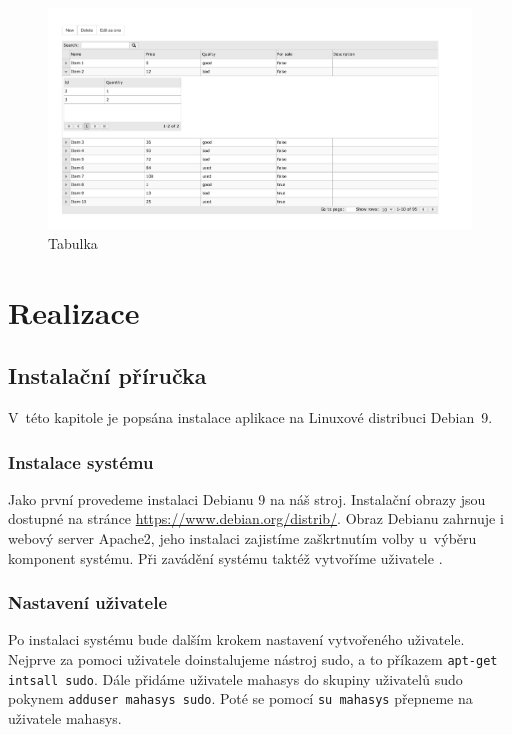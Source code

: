 \documentclass[thesis=B,czech]{FITthesis}[2012/06/26]
\begin{document}
\begin{figure}
	\includegraphics[width=500pt, height=\textwidth, angle=90]{data_table.pdf}
	\caption{Tabulka}\label{tabulka}
\end{figure}
	

\chapter{Realizace}

\section{Instalační příručka}
	V~této kapitole je popsána instalace aplikace na Linuxové distribuci Debian~9.
\subsection{Instalace systému}
	Jako první provedeme instalaci Debianu 9 na náš stroj. Instalační obrazy jsou dostupné na stránce \url{https://www.debian.org/distrib/}. Obraz Debianu zahrnuje i webový server Apache2, jeho instalaci zajistíme zaškrtnutím volby  u~výběru komponent systému. Při zavádění systému taktéž vytvoříme uživatele .
\subsection{Nastavení uživatele}
	Po instalaci systému bude dalším krokem nastavení vytvořeného uživatele. Nejprve za pomoci uživatele  doinstalujeme nástroj sudo, a to příkazem \verb|apt-get intsall sudo|. Dále přidáme uživatele mahasys do skupiny uživatelů sudo pokynem \verb|adduser mahasys sudo|. Poté se pomocí \verb|su mahasys| přepneme na uživatele mahasys.
\end{document}
